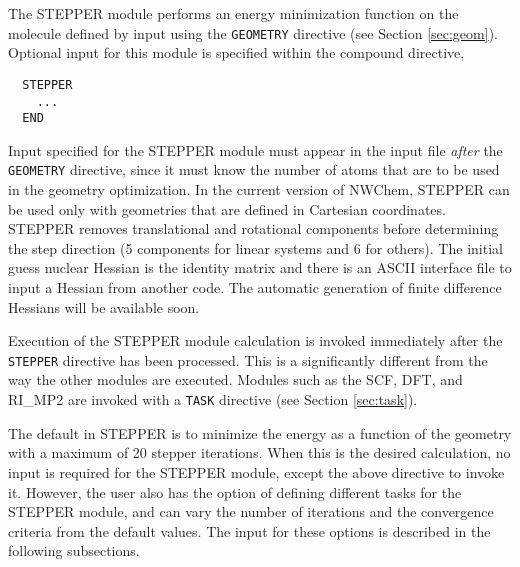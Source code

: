 \label{sec:stepper}

The STEPPER module performs an energy minimization function on the molecule
defined by input using the \verb+GEOMETRY+ directive (see Section 
\ref{sec:geom}).  Optional input for this module is specified within
the compound directive,

\begin{verbatim}
  STEPPER
    ...
  END
\end{verbatim}

Input specified for the STEPPER module must appear in the input file 
{\em after} the \verb+GEOMETRY+ directive, since it must know the
number of atoms that are to be used in the geometry optimization.
In the current version of NWChem, STEPPER can be used  only with geometries
that are defined in 
Cartesian coordinates.  STEPPER removes translational and
rotational components before determining the step direction (5
components for linear systems and 6 for others).  The initial guess
nuclear Hessian is the identity matrix and there is an ASCII interface
file to input a Hessian from another code.  The automatic generation
of finite difference Hessians will be available soon.

Execution of the STEPPER module calculation is invoked immediately after the 
\verb+STEPPER+ directive has been processed.  This is a significantly
different from the way the other modules are executed.  Modules such as
the SCF, DFT, and RI\_MP2 are invoked with a \verb+TASK+ directive (see
Section \ref{sec:task}).

The default in STEPPER is to minimize the energy as a function of the 
geometry with a maximum of 20 stepper iterations.  When this is the
desired calculation, no input is required for the STEPPER module, except
the above directive to invoke it.  However, the user also has the option
of defining different tasks for the STEPPER module, and can vary the
number of iterations and the convergence criteria from the default values.  
The input for these options
is described in the following subsections.



